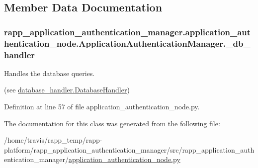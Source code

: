 \subsection{Member Data Documentation}
\hypertarget{classrapp__application__authentication__manager_1_1application__authentication__node_1_1ApplicationAuthenticationManager_aad51dbc5ed8b839dc2606eb32c6cc10b}{
\subsubsection[{\-\_\-db\-\_\-handler}]{\setlength{\rightskip}{0pt plus 5cm}rapp\-\_\-application\-\_\-authentication\-\_\-manager.\-application\-\_\-authentication\-\_\-node.\-Application\-Authentication\-Manager.\-\_\-db\-\_\-handler\hspace{0.3cm}{\ttfamily [private]}}}\label{classrapp__application__authentication__manager_1_1application__authentication__node_1_1ApplicationAuthenticationManager_aad51dbc5ed8b839dc2606eb32c6cc10b}


Handles the database queries. 

(see \hyperlink{classrapp__application__authentication__manager_1_1database__handler_1_1DatabaseHandler}{database\-\_\-handler.\-Database\-Handler}) 

Definition at line 57 of file application\-\_\-authentication\-\_\-node.\-py.



The documentation for this class was generated from the following file\-:\begin{DoxyCompactItemize}
\item 
/home/travis/rapp\-\_\-temp/rapp-\/platform/rapp\-\_\-application\-\_\-authentication\-\_\-manager/src/rapp\-\_\-application\-\_\-authentication\-\_\-manager/\hyperlink{application__authentication__node_8py}{application\-\_\-authentication\-\_\-node.\-py}\end{DoxyCompactItemize}
